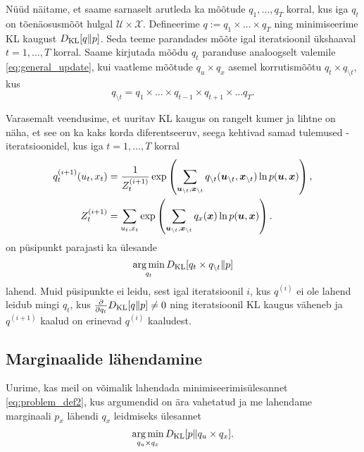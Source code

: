 Nüüd näitame, et saame sarnaselt arutleda ka mõõtude $q_1,\ldots,q_T$ korral, kus iga $q_t$ on tõenäosusmõõt hulgal $\mathcal{U} \times \mathcal{X}$. Defineerime $q := q_1 \times \ldots \times q_T$ ning minimiseerime KL kaugust $D_{\mathrm{KL}}[q\|p]$. Seda teeme parandades mõõte igal iteratsioonil ükshaaval $t=1,\ldots,T$ korral. Saame kirjutada mõõdu $q_t$ paranduse analoogselt valemile \eqref{eq:general_update}, kui vaatleme mõõtude $q_u \times q_x$ asemel korrutismõõtu $q_t \times q_{\setminus t}$, kus 
$$q_{\setminus t} = q_1 \times \ldots \times q_{t-1} \times q_{t+1} \times \ldots q_T.$$

Varasemalt veendusime, et uuritav KL kaugus on rangelt kumer ja lihtne on näha, et see on ka kaks korda diferentseeruv, seega kehtivad samad tulemused - iteratsioonidel, kus iga $t = 1,\ldots,T$ korral 
\begin{align}
    \label{eq:vmp_update}
    q^{(i+1)}_t(u_t,x_t) &= \frac{1}{Z_t^{(i+1)}} \exp \left( \sum_{\bm{u}_{\setminus t}, \bm{x}_{\setminus t}} q_{\setminus t}(\bm{u}_{\setminus t}, \bm{x}_{\setminus t}) \ln p(\bm{u},\bm{x}) \right),\\ 
    \notag
    Z_t^{(i+1)} &= \sum_{u_t,x_t}\exp \left( \sum_{\bm{u}_{\setminus t}, \bm{x}_{\setminus t}} q_x(\bm{x}) \ln p(\bm{u},\bm{x}) \right).
\end{align}
on püsipunkt parajasti ka ülesande
$$
\operatorname*{arg\,min}_{q_t} D_{\mathrm{KL}}[q_t \times q_{\setminus t} \| p]
$$
lahend. Muid püsipunkte ei leidu, sest igal iteratsioonil $i$, kus $q^{(i)}$ ei ole lahend leidub mingi $q_t$, kus $\frac{\partial}{\partial q_{t}} D_{\mathrm{KL}}[q \| p] \ne 0$ ning iteratsioonil KL kaugus väheneb ja $q^{(i+1)}$ kaalud on erinevad $q^{(i)}$ kaaludest.

\subsection{Marginaalide lähendamine}\label{sec:theory_approximating_marginals}

Uurime, kas meil on võimalik lahendada minimiseerimisülesannet \eqref{eq:problem_def2}, kus argumendid on ära vahetatud ja me lahendame marginaali $p_x$ lähendi $q_x$ leidmiseks ülesannet
\begin{equation}
    \label{eq:alt_problem}
    \operatorname*{arg\,min}_{q_u \times q_x}D_{\mathrm{KL}}[p \| q_u \times q_x].
\end{equation}

